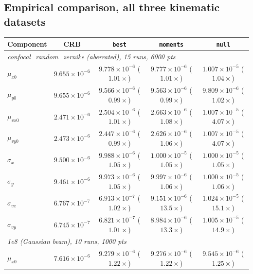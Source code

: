 \documentclass[11pt,a4paper]{article}
\newcommand{\code}[1]{\texttt{#1}}
\begin{document}
\subsection{Empirical comparison, all three kinematic datasets}
\label{sec:spectrum-empirical}

\begin{table}[h]
\centering\small
\begin{tabular}{lcccc}
\toprule
Component & CRB & \code{best} & \code{moments} & \code{null} \\
\midrule
\multicolumn{5}{l}{\emph{confocal\_random\_zernike (aberrated), 15 runs, 6000 pts}} \\
$\mu_{x0}$    & $9.655\times10^{-6}$ & $9.778\times10^{-6}$ ($1.01\times$) & $9.777\times10^{-6}$ ($1.01\times$) & $1.007\times10^{-5}$ ($1.04\times$) \\
$\mu_{y0}$    & $9.655\times10^{-6}$ & $9.566\times10^{-6}$ ($0.99\times$) & $9.563\times10^{-6}$ ($0.99\times$) & $9.809\times10^{-6}$ ($1.02\times$) \\
$\mu_{vx0}$   & $2.471\times10^{-6}$ & $2.504\times10^{-6}$ ($1.01\times$) & $2.663\times10^{-6}$ ($1.08\times$) & $1.007\times10^{-5}$ ($\mathbf{4.07\times}$) \\
$\mu_{vy0}$   & $2.473\times10^{-6}$ & $2.447\times10^{-6}$ ($0.99\times$) & $2.626\times10^{-6}$ ($1.06\times$) & $1.007\times10^{-5}$ ($\mathbf{4.07\times}$) \\
$\sigma_x$    & $9.500\times10^{-6}$ & $9.988\times10^{-6}$ ($1.05\times$) & $1.000\times10^{-5}$ ($1.05\times$) & $1.000\times10^{-5}$ ($1.05\times$) \\
$\sigma_y$    & $9.461\times10^{-6}$ & $9.973\times10^{-6}$ ($1.05\times$) & $9.997\times10^{-6}$ ($1.06\times$) & $1.000\times10^{-5}$ ($1.06\times$) \\
$\sigma_{vx}$ & $6.767\times10^{-7}$ & $6.913\times10^{-7}$ ($1.02\times$) & $9.151\times10^{-6}$ ($\mathbf{13.5\times}$) & $1.024\times10^{-5}$ ($\mathbf{15.1\times}$) \\
$\sigma_{vy}$ & $6.745\times10^{-7}$ & $6.821\times10^{-7}$ ($1.01\times$) & $8.984\times10^{-6}$ ($\mathbf{13.3\times}$) & $1.005\times10^{-5}$ ($\mathbf{14.9\times}$) \\
\midrule
\multicolumn{5}{l}{\emph{1e8 (Gaussian beam), 10 runs, 1000 pts}} \\
$\mu_{x0}$    & $7.616\times10^{-6}$ & $9.279\times10^{-6}$ ($1.22\times$) & $9.276\times10^{-6}$ ($1.22\times$) & $9.545\times10^{-6}$ ($1.25\times$) \\

\end{tabular}
\end{table}
\end{document}
